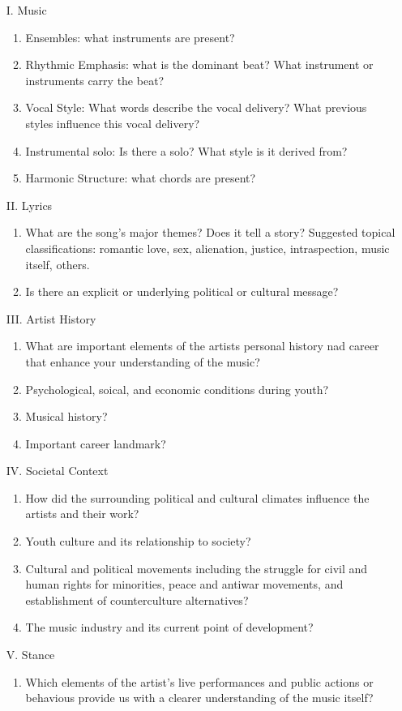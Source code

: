\documentclass[12pt, a4paper, twoside, openright, titlepage]{book}
\begin{document}
\begin{enumerate}
    \item[I.] Music \begin{enumerate}
            \item Ensembles: what instruments are present?
            \item Rhythmic Emphasis: what is the dominant beat? What instrument or instruments carry the beat?
            \item Vocal Style: What words describe the vocal delivery? What previous styles influence this vocal delivery?
            \item Instrumental solo: Is there a solo? What style is it derived from?
            \item Harmonic Structure: what chords are present?
    \end{enumerate}
    \item[II.] Lyrics \begin{enumerate}
            \item What are the song's major themes? Does it tell a story? Suggested topical classifications: romantic love, sex, alienation, justice, intraspection, music itself, others.
            \item Is there an explicit or underlying political or cultural message?
    \end{enumerate}
    \item[III.] Artist History \begin{enumerate}
            \item What are important elements of the artists personal history nad career that enhance your understanding of the music?
            \item Psychological, soical, and economic conditions during youth?
            \item Musical history?
            \item Important career landmark?
    \end{enumerate}
    \item[IV.] Societal Context \begin{enumerate}
            \item How did the surrounding political and cultural climates influence the artists and their work?
            \item Youth culture and its relationship to society?
            \item Cultural and political movements including the struggle for civil and human rights for minorities, peace and antiwar movements, and establishment of counterculture alternatives?
            \item The music industry and its current point of development?
    \end{enumerate}
    \item[V.] Stance \begin{enumerate}
            \item Which elements of the artist's live performances and public actions or behavious provide us with a clearer understanding of the music itself?
    \end{enumerate}
\end{enumerate}
\end{document}
